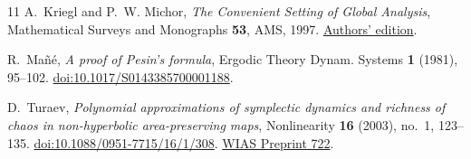 \documentclass[11pt]{article}
\begin{document}
\begin{thebibliography}{11}
A.~Kriegl and P.~W. Michor, \emph{The Convenient Setting of Global
Analysis}, Mathematical Surveys and Monographs \textbf{53}, AMS, 1997.
\href{https://www.mat.univie.ac.at/~michor/apbookh-ams.pdf}{Authors' edition}.

R.~Ma\~n\'e, \emph{A proof of Pesin's formula}, Ergodic Theory
Dynam. Systems \textbf{1} (1981), 95--102.
\href{https://doi.org/10.1017/S0143385700001188}{doi:10.1017/S0143385700001188}.

D.~Turaev, \emph{Polynomial approximations of symplectic dynamics and
richness of chaos in non-hyperbolic area-preserving maps},
Nonlinearity \textbf{16} (2003), no.~1, 123--135.
\href{https://doi.org/10.1088/0951-7715/16/1/308}{doi:10.1088/0951-7715/16/1/308}.
\href{https://doi.org/10.20347/WIAS.PREPRINT.722}{WIAS Preprint 722}.
\end{thebibliography}
\end{document}
